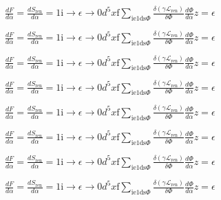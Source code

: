 \documentclass[a4paper,12pt]{article}
\begin{document}
$\displaystyle \frac{dF}{d\alpha}=\frac{dS_{\mathrm{r}\mathrm{e}\mathrm{n}}}{d\alpha}=1\mathrm{i}\rightarrow\epsilon\rightarrow 0 d^{5}x\displaystyle \mathrm{f}\sum_{\mathrm{i}\mathrm{e}1\mathrm{d}\mathrm{s}\Phi}\frac{\delta(\gamma \mathcal{L}_{\mathrm{r}\mathrm{e}\mathrm{n}})}{\delta\Phi}\frac{d\Phi}{d\alpha}  z=\epsilon$

$\displaystyle \frac{dF}{d\alpha}=\frac{dS_{\mathrm{r}\mathrm{e}\mathrm{n}}}{d\alpha}=1\mathrm{i}\rightarrow\epsilon\rightarrow 0 d^{5}x\displaystyle \mathrm{f}\sum_{\mathrm{i}\mathrm{e}1\mathrm{d}\mathrm{s}\Phi}\frac{\delta(\gamma \mathcal{L}_{\mathrm{r}\mathrm{e}\mathrm{n}})}{\delta\Phi}\frac{d\Phi}{d\alpha}  z=\epsilon$

$\displaystyle \frac{dF}{d\alpha}=\frac{dS_{\mathrm{r}\mathrm{e}\mathrm{n}}}{d\alpha}=1\mathrm{i}\rightarrow\epsilon\rightarrow 0 d^{5}x\displaystyle \mathrm{f}\sum_{\mathrm{i}\mathrm{e}1\mathrm{d}\mathrm{s}\Phi}\frac{\delta(\gamma \mathcal{L}_{\mathrm{r}\mathrm{e}\mathrm{n}})}{\delta\Phi}\frac{d\Phi}{d\alpha}  z=\epsilon$

$\displaystyle \frac{dF}{d\alpha}=\frac{dS_{\mathrm{r}\mathrm{e}\mathrm{n}}}{d\alpha}=1\mathrm{i}\rightarrow\epsilon\rightarrow 0 d^{5}x\displaystyle \mathrm{f}\sum_{\mathrm{i}\mathrm{e}1\mathrm{d}\mathrm{s}\Phi}\frac{\delta(\gamma \mathcal{L}_{\mathrm{r}\mathrm{e}\mathrm{n}})}{\delta\Phi}\frac{d\Phi}{d\alpha}  z=\epsilon$

$\displaystyle \frac{dF}{d\alpha}=\frac{dS_{\mathrm{r}\mathrm{e}\mathrm{n}}}{d\alpha}=1\mathrm{i}\rightarrow\epsilon\rightarrow 0 d^{5}x\displaystyle \mathrm{f}\sum_{\mathrm{i}\mathrm{e}1\mathrm{d}\mathrm{s}\Phi}\frac{\delta(\gamma \mathcal{L}_{\mathrm{r}\mathrm{e}\mathrm{n}})}{\delta\Phi}\frac{d\Phi}{d\alpha}  z=\epsilon$

$\displaystyle \frac{dF}{d\alpha}=\frac{dS_{\mathrm{r}\mathrm{e}\mathrm{n}}}{d\alpha}=1\mathrm{i}\rightarrow\epsilon\rightarrow 0 d^{5}x\displaystyle \mathrm{f}\sum_{\mathrm{i}\mathrm{e}1\mathrm{d}\mathrm{s}\Phi}\frac{\delta(\gamma \mathcal{L}_{\mathrm{r}\mathrm{e}\mathrm{n}})}{\delta\Phi}\frac{d\Phi}{d\alpha}  z=\epsilon$

$\displaystyle \frac{dF}{d\alpha}=\frac{dS_{\mathrm{r}\mathrm{e}\mathrm{n}}}{d\alpha}=1\mathrm{i}\rightarrow\epsilon\rightarrow 0 d^{5}x\displaystyle \mathrm{f}\sum_{\mathrm{i}\mathrm{e}1\mathrm{d}\mathrm{s}\Phi}\frac{\delta(\gamma \mathcal{L}_{\mathrm{r}\mathrm{e}\mathrm{n}})}{\delta\Phi}\frac{d\Phi}{d\alpha}  z=\epsilon$

$\displaystyle \frac{dF}{d\alpha}=\frac{dS_{\mathrm{r}\mathrm{e}\mathrm{n}}}{d\alpha}=1\mathrm{i}\rightarrow\epsilon\rightarrow 0 d^{5}x\displaystyle \mathrm{f}\sum_{\mathrm{i}\mathrm{e}1\mathrm{d}\mathrm{s}\Phi}\frac{\delta(\gamma \mathcal{L}_{\mathrm{r}\mathrm{e}\mathrm{n}})}{\delta\Phi}\frac{d\Phi}{d\alpha}  z=\epsilon$
\end{document}
